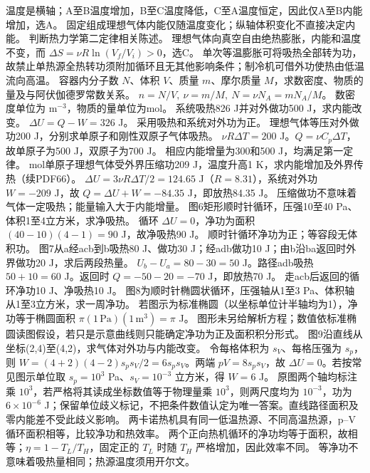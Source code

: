 \workings 温度是横轴；A至B温度增加，B至C温度降低，C至A温度恒定，因此仅A至B内能增加，选A。
\crosscheck 固定组成理想气体内能仅随温度变化；纵轴体积变化不直接决定内能。
\problemtext 判断热力学第二定律相关陈述。
\workings 理想气体向真空自由绝热膨胀，内能和温度不变，而 $\Delta S=\nu R\ln(V_f/V_i)>0$，选C。
\crosscheck 单次等温膨胀可将吸热全部转为功，故禁止单热源全热转功须附加循环且无其他影响条件；制冷机可借外功使热由低温流向高温。
\problemtext 容器内分子数 $N$、体积 $V$、质量 $m$、摩尔质量 $M$，求数密度、物质的量及与阿伏伽德罗常数关系。
\workings $n=N/V,\ \nu=m/M,\ N=\nu N_A=mN_A/M$。
\crosscheck 数密度单位为 $\mathrm{m^{-3}}$，物质的量单位为mol。
\problemtext 系统吸热826 J并对外做功500 J，求内能改变。
\workings $\Delta U=Q-W=326$ J。
\crosscheck 采用吸热和系统对外功为正。
\problemtext 理想气体等压对外做功200 J，分别求单原子和刚性双原子气体吸热。
\workings $\nu R\Delta T=200$ J。$Q=\nu C_p\Delta T$，故单原子为500 J，双原子为700 J。
\crosscheck 相应内能增量为300和500 J，均满足第一定律。
 mol单原子理想气体受外界压缩功209 J，温度升高1 K，求内能增加及外界传热（续PDF66）。
\workings $\Delta U=3\nu R\Delta T/2=124.65$ J（$R=8.31$），系统对外功 $W=-209$ J，故 $Q=\Delta U+W=-84.35$ J，即放热84.35 J。
\crosscheck 压缩做功不意味着气体一定吸热；能量输入大于内能增量。
\problemtext 图6矩形顺时针循环，压强10至40 Pa、体积1至4立方米，求净吸热。
\workings 循环 $\Delta U=0$，净功为面积 $(40-10)(4-1)=90$ J，故净吸热90 J。
\crosscheck 顺时针循环净功为正；等容段无体积功。
\problemtext 图7从a经acb到b吸热80 J、做功30 J；经adb做功10 J；由b沿ba返回时外界做功20 J，求后两段热量。
\workings $U_b-U_a=80-30=50$ J。路径adb吸热 $50+10=60$ J。返回时 $Q=-50-20=-70$ J，即放热70 J。
\crosscheck 走acb后返回的循环净功10 J、净吸热10 J。
\problemtext 图8为顺时针椭圆状循环，压强轴从1至3 Pa、体积轴从1至3立方米，求一周净功。
\workings 若图示为标准椭圆（以坐标单位计半轴均为1），净功等于椭圆面积 $\pi(1\,\mathrm{Pa})(1\,\mathrm{m^3})=\pi$ J。
\crosscheck 图形未另给解析方程；数值依标准椭圆读图假设，若只是示意曲线则只能确定净功为正及面积积分形式。
\problemtext 图9沿直线从坐标(2,4)至(4,2)，求气体对外功与内能改变。
\workings 令每格体积为 $s_V$、每格压强为 $s_p$，则 $W=(4+2)(4-2)s_ps_V/2=6s_ps_V$。两端 $pV=8s_ps_V$，故 $\Delta U=0$。若按常见图示单位取 $s_p=10^3$ Pa、$s_V=10^{-3}$ 立方米，得 $W=6$ J。
\crosscheck 原图两个轴均标注乘 $10^3$，若严格将其读成坐标数值等于物理量乘 $10^3$，则两尺度均为 $10^{-3}$，功为 $6\times10^{-6}$ J；保留单位歧义标记，不把条件数值认定为唯一答案。直线路径面积及零内能差不受此歧义影响。
\problemtext 两卡诺热机具有同一低温热源、不同高温热源，p--V循环面积相等，比较净功和热效率。
\workings 两个正向热机循环的净功均等于面积，故相等；$\eta=1-T_L/T_H$，固定正的 $T_L$ 时随 $T_H$ 严格增加，因此效率不同。
\crosscheck 等净功不意味着吸热量相同；热源温度须用开尔文。

